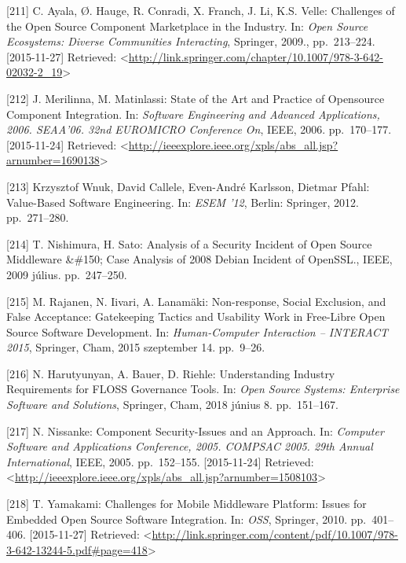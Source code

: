 \documentclass[12pt,magyar,a4paper,oneside]{scrreprt}
\begin{document}
\leavevmode\hypertarget{ref-ayala_challenges_2009}{}%
{[}211{]} C. Ayala, Ø. Hauge, R. Conradi, X. Franch, J. Li, K.S. Velle:
Challenges of the Open Source Component Marketplace in the Industry. In:
\emph{Open Source Ecosystems: Diverse Communities Interacting},
Springer, 2009., pp.~213--224. {[}2015-11-27{]} Retrieved:
\textless{}\url{http://link.springer.com/chapter/10.1007/978-3-642-02032-2_19}\textgreater{}

\leavevmode\hypertarget{ref-merilinna_state_2006}{}%
{[}212{]} J. Merilinna, M. Matinlassi: State of the Art and Practice of
Opensource Component Integration. In: \emph{Software Engineering and
Advanced Applications, 2006. SEAA'06. 32nd EUROMICRO Conference On},
IEEE, 2006. pp.~170--177. {[}2015-11-24{]} Retrieved:
\textless{}\url{http://ieeexplore.ieee.org/xpls/abs_all.jsp?arnumber=1690138}\textgreater{}

\leavevmode\hypertarget{ref-krzysztof_wnuk_value-based_2012}{}%
{[}213{]} Krzysztof Wnuk, David Callele, Even-André Karlsson, Dietmar
Pfahl: Value-Based Software Engineering. In: \emph{ESEM '12}, Berlin:
Springer, 2012. pp.~271--280.

\leavevmode\hypertarget{ref-nishimura_analysis_2009}{}%
{[}214{]} T. Nishimura, H. Sato: Analysis of a Security Incident of Open
Source Middleware \&\#150; Case Analysis of 2008 Debian Incident of
OpenSSL., IEEE, 2009 július. pp.~247--250.

\leavevmode\hypertarget{ref-rajanen_non-response_2015}{}%
{[}215{]} M. Rajanen, N. Iivari, A. Lanamäki: Non-response, Social
Exclusion, and False Acceptance: Gatekeeping Tactics and Usability Work
in Free-Libre Open Source Software Development. In: \emph{Human-Computer
Interaction -- INTERACT 2015}, Springer, Cham, 2015 szeptember 14.
pp.~9--26.

\leavevmode\hypertarget{ref-harutyunyan_understanding_2018}{}%
{[}216{]} N. Harutyunyan, A. Bauer, D. Riehle: Understanding Industry
Requirements for FLOSS Governance Tools. In: \emph{Open Source Systems:
Enterprise Software and Solutions}, Springer, Cham, 2018 június 8.
pp.~151--167.

\leavevmode\hypertarget{ref-nissanke_component_2005}{}%
{[}217{]} N. Nissanke: Component Security-Issues and an Approach. In:
\emph{Computer Software and Applications Conference, 2005. COMPSAC 2005.
29th Annual International}, IEEE, 2005. pp.~152--155. {[}2015-11-24{]}
Retrieved:
\textless{}\url{http://ieeexplore.ieee.org/xpls/abs_all.jsp?arnumber=1508103}\textgreater{}

\leavevmode\hypertarget{ref-yamakami_challenges_2010}{}%
{[}218{]} T. Yamakami: Challenges for Mobile Middleware Platform: Issues
for Embedded Open Source Software Integration. In: \emph{OSS}, Springer,
2010. pp.~401--406. {[}2015-11-27{]} Retrieved:
\textless{}\url{http://link.springer.com/content/pdf/10.1007/978-3-642-13244-5.pdf\#page=418}\textgreater{}
\end{document}
